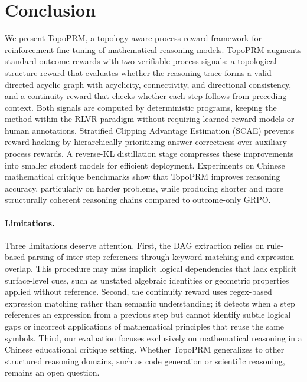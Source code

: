 \section{Conclusion}
\label{sec:conclusion}

We present TopoPRM, a topology-aware process reward framework for
reinforcement fine-tuning of mathematical reasoning models. TopoPRM
augments standard outcome rewards with two verifiable process signals: a
topological structure reward that evaluates whether the reasoning trace
forms a valid directed acyclic graph with acyclicity, connectivity, and
directional consistency, and a continuity reward that checks whether each
step follows from preceding context. Both signals are computed by
deterministic programs, keeping the method within the RLVR paradigm
without requiring learned reward models or human annotations. Stratified
Clipping Advantage Estimation (SCAE) prevents reward hacking by
hierarchically prioritizing answer correctness over auxiliary process
rewards. A reverse-KL distillation stage compresses these improvements
into smaller student models for efficient deployment. Experiments on
Chinese mathematical critique benchmarks show that TopoPRM improves
reasoning accuracy, particularly on harder problems, while producing
shorter and more structurally coherent reasoning chains compared to
outcome-only GRPO.

\paragraph{Limitations.}
Three limitations deserve attention. First, the DAG extraction relies on
rule-based parsing of inter-step references through keyword matching and
expression overlap. This procedure may miss implicit logical dependencies
that lack explicit surface-level cues, such as unstated algebraic
identities or geometric properties applied without reference. Second, the
continuity reward uses regex-based expression matching rather than
semantic understanding; it detects when a step references an expression
from a previous step but cannot identify subtle logical gaps or incorrect
applications of mathematical principles that reuse the same symbols.
Third, our evaluation focuses exclusively on mathematical reasoning in a
Chinese educational critique setting. Whether TopoPRM generalizes to
other structured reasoning domains, such as code generation or scientific
reasoning, remains an open question.

